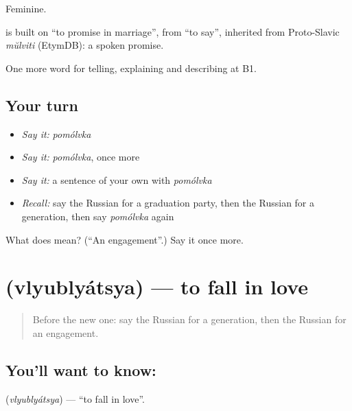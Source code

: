 Feminine.

\begin{cousinweb}
\emph{} is built on \emph{} \textquotedblleft{}to promise in marriage\textquotedblright{}, from \emph{} \textquotedblleft{}to say\textquotedblright{}, inherited from Proto-Slavic \emph{mŭlviti} (EtymDB): a spoken promise.
\end{cousinweb}

\begin{grammarlens}[title={What you've built}]
One more word for telling, explaining and describing at B1.
\end{grammarlens}

\subsection*{Your turn}
\begin{itemize}
\raggedright
  \item \emph{Say it:} \emph{pomólvka}
  \item \emph{Say it:} \emph{pomólvka}, once more
  \item \emph{Say it:} a sentence of your own with \emph{pomólvka}
  \item \emph{Recall:} say the Russian for a graduation party, then the Russian for a generation, then say \emph{pomólvka} again
\end{itemize}

\begin{tcolorbox}[breakable,colback=teal!4,colframe=teal!35!black,title={Before you move on}]
What does  mean? (\textquotedblleft{}An engagement\textquotedblright{}.) Say it once more.
\end{tcolorbox}
\section[\texorpdfstring{\ru{влюбляться} (vlyublyátsya)}{влюбляться (vlyublyátsya)}]{ (vlyublyátsya) — to fall in love}

\label{lesson:RU-C306-vlyublyatsya}



\begin{quote}
Before the new one: say the Russian for a generation, then the Russian for an engagement.
\end{quote}

\subsection*{You'll want to know: }
\textbf{} (\emph{vlyublyátsya}) — \textquotedblleft{}to fall in love\textquotedblright{}.

